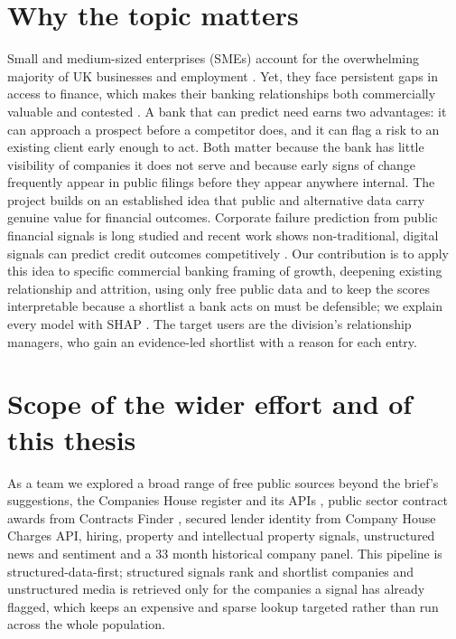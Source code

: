 \documentclass[ %
                    author={Daniel Page},
                supervisor={Dr. Andrew Calway},
                    degree={MSc},
                     title={Some Structural Guidelines for Data Science MSc Theses, Including Those With Long Titles that Run Across Multiple Lines on the Front Page},
                  subtitle={And those including an optional subtitle too, for good measure},
                      type={},
                      year={2021}]{dissertation}
\begin{document}
\section{Why the topic matters}
Small and medium-sized enterprises (SMEs) account for the overwhelming majority of UK businesses and employment \cite{beis_bpe}. Yet, they face persistent gaps in access to finance, which makes their banking relationships both commercially valuable and contested \cite{bbb_2024,oecd_2024_sme}. A bank that can predict need earns two advantages: it can approach a prospect before a competitor does, and it can flag a risk to an existing client early enough to act. Both matter because the bank has little visibility of companies it does not serve and because early signs of change frequently appear in public filings before they appear anywhere internal. The project builds on an established idea that public and alternative data carry genuine value for financial outcomes. Corporate failure prediction from public financial signals is long studied \cite{altman_1968} and recent work shows non-traditional, digital signals can predict credit outcomes competitively \cite{berg_etal_2020}. Our contribution is to apply this idea to specific commercial banking framing of growth, deepening existing relationship and attrition, using only free public data and to keep the scores interpretable because a shortlist a bank acts on must be defensible; we explain every model with SHAP \cite{lundberg_lee_2017}. The target users are the division's relationship managers, who gain an evidence-led shortlist with a reason for each entry.

\section{Scope of the wider effort and of this thesis}
As a team we explored a broad range of free public sources beyond the brief's suggestions, the Companies House register and its APIs \cite{companieshouse_api}, public sector contract awards from Contracts Finder \cite{contractsfinder, ocds}, secured lender identity from Company House Charges API, hiring, property and intellectual property signals, unstructured news and sentiment and a 33 month historical company panel. This pipeline is structured-data-first; structured signals rank and shortlist companies and unstructured media is retrieved only for the companies a signal has already flagged, which keeps an expensive and sparse lookup targeted rather than run across the whole population.
\end{document}
